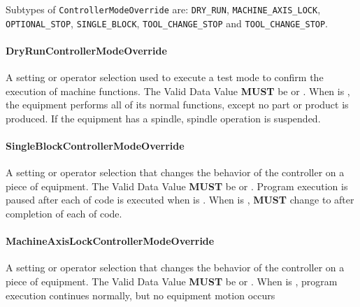 \FloatBarrier

Subtypes of \texttt{ControllerModeOverride} are: \texttt{DRY_RUN}, \texttt{MACHINE_AXIS_LOCK}, \texttt{OPTIONAL_STOP}, \texttt{SINGLE_BLOCK}, \texttt{TOOL_CHANGE_STOP} and \texttt{TOOL_CHANGE_STOP}. 
\FloatBarrier

\paragraph{DryRunControllerModeOverride}\mbox{}
\label{sec:DryRunControllerModeOverride}



A setting or operator selection used to execute a test mode to confirm the execution of machine functions. 
 The \gls{Valid Data Value} \textbf{MUST} be  or . 
 When  is , the equipment performs all of its normal functions, except no part or product is produced.  If the equipment has a spindle, spindle operation is suspended.


\paragraph{SingleBlockControllerModeOverride}\mbox{}
\label{sec:SingleBlockControllerModeOverride}



A setting or operator selection that changes the behavior of the controller on a piece of equipment. 
 The \gls{Valid Data Value} \textbf{MUST} be  or .
 Program execution is paused after each  of code is executed when  is .   
 When  is ,  \textbf{MUST} change to  after completion of each  of code. 


\paragraph{MachineAxisLockControllerModeOverride}\mbox{}
\label{sec:MachineAxisLockControllerModeOverride}



A setting or operator selection that changes the behavior of the controller on a piece of equipment. 
 The \gls{Valid Data Value} \textbf{MUST} be  or . 
 When  is , program execution continues normally, but no equipment motion occurs 


